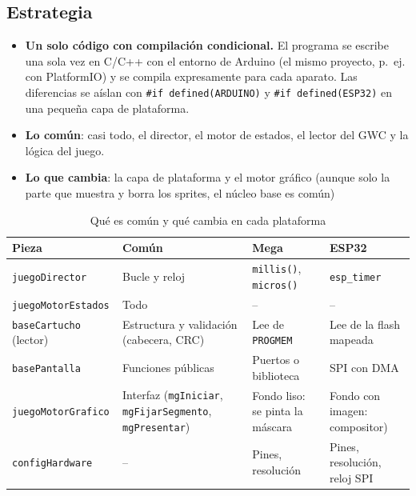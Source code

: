 \subsection{Estrategia}
\label{sec:F6I01Estrategia}

\begin{itemize}
	\item \textbf{Un solo código con compilación condicional.} El programa se escribe una sola vez en C/C++ con el entorno de Arduino (el mismo proyecto, p.~ej. con PlatformIO) y se compila expresamente para cada aparato. Las diferencias se aíslan con \texttt{\#if defined(ARDUINO)} y \texttt{\#if defined(ESP32)} en una pequeña capa de plataforma.
	\item \textbf{Lo común}: casi todo, el director, el motor de estados, el lector del GWC y la lógica del juego.
	\item \textbf{Lo que cambia}: la capa de plataforma y el motor gráfico (aunque solo la parte que muestra y borra los sprites, el núcleo base es común)
\end{itemize}

\begin{table}[H]
	\centering
	\begin{tabular}{lp{3.2cm}p{3.6cm}p{3.6cm}}
		\toprule
		Pieza & Común & Mega & ESP32 \\
		\midrule
		\texttt{juegoDirector} & Bucle y reloj & \texttt{millis()}, \texttt{micros()} & \texttt{esp\_timer} \\
		\texttt{juegoMotorEstados} & Todo & -- & -- \\
		\texttt{baseCartucho} (lector) & Estructura y validación (cabecera, CRC) & Lee de \texttt{PROGMEM} & Lee de la flash mapeada \\
		\texttt{basePantalla} & Funciones públicas & Puertos o biblioteca & SPI con DMA \\
		\texttt{juegoMotorGrafico} & Interfaz (\texttt{mgIniciar}, \texttt{mgFijarSegmento}, \texttt{mgPresentar}) & Fondo liso: se pinta la máscara & Fondo con imagen: compositor) \\
		\texttt{configHardware} & -- & Pines, resolución & Pines, resolución, reloj SPI \\
		\bottomrule
	\end{tabular}
	\caption{Qué es común y qué cambia en cada plataforma}
	\label{tab:F6I01Comun}
\end{table}

